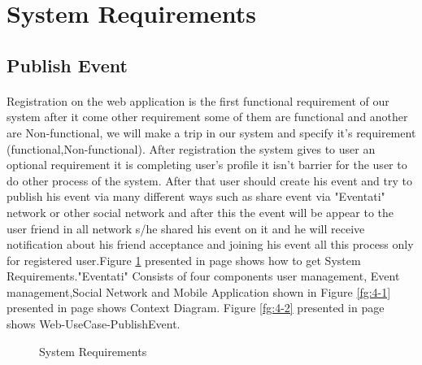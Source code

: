 \documentclass[12pt,a4paper,class,twoside,openany]{report}
\begin{document}
{\section{System Requirements}
 \subsection{Publish Event}
 \paragraph*{\hspace{.9 cm} }   Registration  on the web application  is the first functional requirement of our system after it come other requirement some of them are functional and another are Non-functional, we  will  make a trip in our system and  specify it's requirement (functional,Non-functional).
After registration the system gives to user an optional requirement it is completing user's profile it isn't barrier for the user to do other process of the system.
After that user should create his event and try to publish his event via many different ways such as share event via "Eventati" network or other social network and after this the event will be appear to the user friend in all network s/he shared his event on it and he will receive notification about his friend acceptance and joining his event all this process only for registered user.Figure \ref{fg:4-0} presented in page \pageref{fg:4-0} shows how to get System Requirements."Eventati" Consists of four components user management, Event management,Social Network and Mobile Application shown in Figure \ref{fg:4-1} presented in page \pageref{fg:4-1} shows Context Diagram. Figure \ref{fg:4-2} presented in page \pageref{fg:4-2} shows Web-UseCase-PublishEvent.
\begin{figure}
\begin{center}
\caption{System Requirements}
\label{fg:4-0}
\end{center}
\end{figure}

}
\end{document}

